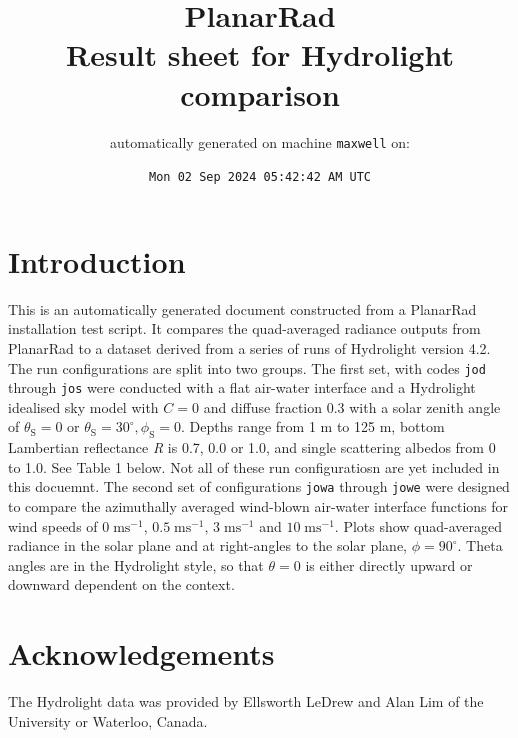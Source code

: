 \documentclass[10pt,a4paper]{article}
\begin{document}
\title{PlanarRad\\Result sheet for Hydrolight comparison}
\author{automatically generated on machine \texttt{maxwell} on:}
\date{\texttt{Mon 02 Sep 2024 05:42:42 AM UTC}}

\maketitle



\section*{Introduction}

This is an automatically generated document constructed from a PlanarRad installation test script. It compares the quad-averaged radiance outputs from PlanarRad to a dataset derived from a series of runs of Hydrolight version 4.2. The run configurations are split into two groups. The first set, with codes \texttt{jod} through \texttt{jos} were conducted with a flat air-water interface and a Hydrolight idealised sky model with $C=0$ and diffuse fraction 0.3 with a solar zenith angle of $\theta_\mathrm{S}=0$ or $\theta_\mathrm{S}=30^{\circ},\phi_\mathrm{S}=0$. Depths range from 1 m to 125 m, bottom Lambertian reflectance \textit{R} is 0.7, 0.0 or 1.0, and single scattering albedos from 0 to 1.0. See Table 1 below. Not all of these run configuratiosn are yet included in this docuemnt. The second set of configurations \texttt{jowa} through \texttt{jowe} were designed to compare the azimuthally averaged wind-blown air-water interface functions for wind speeds of $0\;\mathrm{ms}^{-1}$, $0.5\;\mathrm{ms}^{-1}$, $3\;\mathrm{ms}^{-1}$ and $10\;\mathrm{ms}^{-1}$. Plots show quad-averaged radiance in the solar plane and at right-angles to the solar plane, $\phi=90^{\circ}$. Theta angles are in the Hydrolight style, so that $\theta=0$ is either directly upward or downward dependent on the context.

\section*{Acknowledgements}

The Hydrolight data was provided by Ellsworth LeDrew and Alan Lim of the University or Waterloo, Canada.
\end{document}

